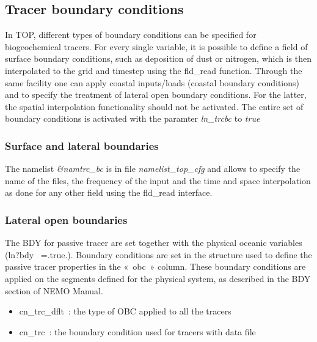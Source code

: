 \documentclass[../main/TOP_manual]{subfiles}
\begin{document}
\subsection{Tracer boundary conditions}

In TOP, different types of boundary conditions can be specified for biogeochemical tracers. For every single variable, it is possible to define a field of surface boundary conditions, such as deposition of dust or nitrogen, which is then interpolated to the grid and timestep using the fld\_read function. Through the same facility one can apply coastal inputs/loads (coastal boundary conditions) and to specify the treatment of lateral open boundary conditions. For the latter, the spatial interpolation functionality should not be activated. The entire set of boundary conditions is activated with the paramter \textit{ln\_trcbc} to \textit{true}


\subsubsection{Surface and lateral boundaries}

The namelist \textit{\&namtrc\_bc}  is in file \textit{namelist\_top\_cfg}  and allows to specify the name of the files, the frequency of the input and the time and space interpolation as done for any other field using the fld\_read interface.

\subsubsection{Lateral open boundaries}

The BDY for passive tracer are set together with the physical oceanic variables (ln?bdy  =.true.). Boundary conditions are set in the structure used to define the passive tracer properties in the « obc » column. These boundary conditions are applied on the segments defined for the physical system, as described in the BDY section of NEMO Manual.
\begin{itemize}
	\item cn\_trc\_dflt : the type of OBC applied to all the tracers
	\item cn\_trc :  the boundary condition used for tracers with data file
\end{itemize} 
\end{document}
